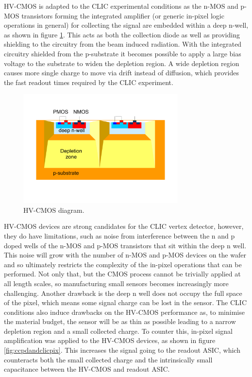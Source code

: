 HV-CMOS is adapted to the CLIC experimental conditions as the n-MOS and p-MOS transistors forming the integrated amplifier (or generic in-pixel logic operations in general) for collecting the signal are embedded within a deep n-well, as shown in figure \ref{fig:hvcmos}.  This acts as both the collection diode as well as providing shielding to the circuitry from the beam induced radiation.  With the integrated circuitry shielded from the p-substrate it becomes possible to apply a large bias voltage to the substrate to widen the depletion region.  A wide depletion region causes more single charge to move via drift instead of diffusion, which provides the fast readout times required by the CLIC experiment.  

\begin{figure}
\centering
\includegraphics[width=0.75\textwidth]{CLICdpVertex/Plots/HV-CMOSDiagram.pdf}
\caption[HV-CMOS diagram.]{HV-CMOS diagram.}
\label{fig:hvcmos}
\end{figure}

HV-CMOS devices are strong candidates for the CLIC vertex detector, however, they do have limitations, such as noise from interference between the n and p doped wells of the n-MOS and p-MOS transistors that sit within the deep n well.  This noise will grow with the number of n-MOS and p-MOS devices on the wafer and so ultimately restricts the complexity of the in-pixel operations that can be performed.  Not only that, but the CMOS process cannot be trivially applied at all length scales, so manufacturing small sensors becomes increasingly more challenging.  Another drawback is the deep n well does not occupy the full space of the pixel, which means some signal charge can be lost in the sensor.  The CLIC conditions also induce drawbacks on the HV-CMOS performance as, to minimise the material budget, the sensor will be as thin as possible leading to a narrow depletion region and a small collected charge.  To counter this, in-pixel signal amplification was applied to the HV-CMOS devices, as shown in figure \ref{fig:ccpdandclicpix}.  This increases the signal going to the readout ASIC, which counteracts both the small collected charge and the intrinsically small capacitance between the HV-CMOS and readout ASIC.

